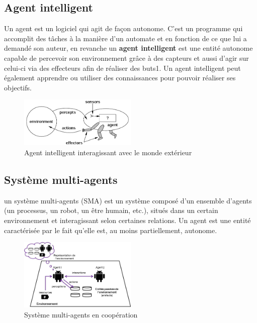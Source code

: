 \subsection{Agent intelligent}
Un agent est un logiciel qui agit de façon autonome. C'est un programme qui accomplit des tâches à la manière d'un automate et en fonction de ce que lui a demandé son auteur, en revanche un \textbf{agent intelligent} est une entité autonome capable de percevoir son environnement grâce à des capteurs et aussi d'agir sur celui-ci via des effecteurs afin de réaliser des buts1. Un agent intelligent peut également apprendre ou utiliser des connaissances pour pouvoir réaliser ses objectifs.
\begin{figure}[H]
	\centering
	\includegraphics[width=0.5\textwidth]{imgs/intelligentAgent.png}
	\caption{Agent intelligent interagissant avec le monde extérieur }
\end{figure}

\subsection{Système multi-agents}
un système multi-agents (SMA) est un système composé d'un ensemble d'agents (un processus, un robot, un être humain, etc.), situés dans un certain environnement et interagissant selon certaines relations. Un agent est une entité caractérisée par le fait qu'elle est, au moins partiellement, autonome.
\begin{figure}[H]
	\centering
	\includegraphics[width=0.5\textwidth]{imgs/SMA.jpg}
	\caption{Système multi-agents en coopération}
\end{figure}

